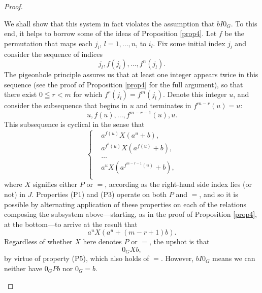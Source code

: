 \documentclass[pdflatex,sn-apa,11pt]{sn-jnl}%
\begin{document}
\begin{proof}
\begin{itemize}
We shall show that this system in fact violates the assumption that $bI0_G$. To this end, it helps to borrow some of the ideas of Proposition \ref{prop4}. Let $f$ be the permutation that maps each $j_l$, $l = 1, \dots, n$, to $i_l$. Fix some initial index $j_l$ and consider the sequence of indices \begin{equation*}j_l, f(j_l), \dots, f^{n}(j_l).\end{equation*}
The pigeonhole principle assures us that at least one integer appears twice in this sequence (see the proof of Proposition \ref{prop4} for the full argument), so that there exist $0 \leqq r < m$ for which $f^{r}(j_l) = f^{m}(j_l)$. Denote this integer $u$, and consider the subsequence that begins in $u$ and terminates in $f^{m-r}(u) = u$: \begin{equation*}u, f(u), \dots, f^{m-r-1}(u), u.\end{equation*} 
This subsequence is cyclical in the sense that \begin{equation*}
  \left\{
    \begin{aligned}
      & a^{f(u)}X(a^{u} + b), \\
      & a^{f^2(u)}X(a^{f(u)} + b), \\
      & \dots \\
      & a^{u} X (a^{f^{m-r-1}(u)} + b), \\
    \end{aligned}
  \right.
\end{equation*}
where $X$ signifies either $P$ or $=$, according as the right-hand side index lies (or not) in $J$. Properties (P1) and (P3) operate on both $P$ and $=$, and so it is possible by alternating application of these properties on each of the relations composing the subsystem above---starting, as in the proof of Proposition \ref{prop4}, at the bottom---to arrive at the result that \begin{equation*}a^uX(a^{u} + (m-r+1)b).\end{equation*}
Regardless of whether $X$ here denotes $P$ or $=$, the upshot is that \begin{equation*}0_GXb,\end{equation*}
by virtue of property (P5), which also holds of $=$. However, $bI0_G$ means we can neither have $0_GPb$ nor $0_G = b$.


\end{itemize}
\end{proof}
\end{document}
